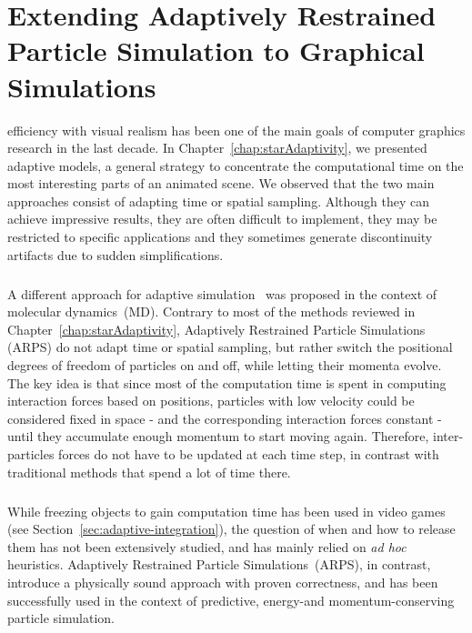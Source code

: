 \chapter[Extending ARPS to Graphical Simulations]{Extending Adaptively Restrained Particle Simulation to Graphical Simulations}
\label{chap:arps}

 efficiency with visual realism has been one of the main goals of computer graphics research in the last decade. 
In Chapter~\ref{chap:starAdaptivity}, we presented adaptive models, a general strategy to concentrate the computational time on the most interesting parts of an animated scene. 
We observed that the two main approaches consist of adapting time or spatial sampling. 
Although they can achieve impressive results, they are often difficult to implement, they may be restricted to specific applications and they sometimes generate discontinuity artifacts due to sudden simplifications.
\paragraph*{}
A different approach for adaptive simulation~\cite{Artemova2012} was proposed in the context of molecular dynamics~(MD). Contrary to most of the methods reviewed in Chapter~\ref{chap:starAdaptivity}, Adaptively Restrained Particle Simulations (ARPS) do not adapt time or spatial sampling, but rather switch the positional degrees of freedom of particles on and off, while letting their momenta evolve. The key idea is that since most of the computation time is spent in computing interaction forces based on positions, particles with low velocity could be considered fixed in space - and the corresponding interaction forces constant - until they accumulate enough momentum to start moving again. Therefore, inter-particles forces do not have to be updated at each time step, in contrast with traditional methods that spend a lot of time there.
\paragraph*{}
While freezing objects to gain computation time has been used in video games (see Section~\ref{sec:adaptive-integration}), the question of when and how to release them has not been extensively studied, and has mainly relied on \textit{ad hoc} heuristics.
Adaptively Restrained Particle Simulations~(ARPS), in contrast, introduce a physically sound approach with proven correctness, and has been successfully used in the context of predictive, energy-and momentum-conserving particle simulation.
